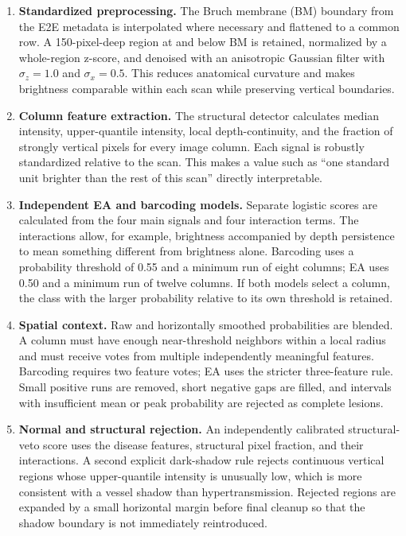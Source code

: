 \documentclass[11pt]{article}
\begin{document}
\begin{enumerate}
    \item \textbf{Standardized preprocessing.}  The Bruch membrane (BM)
    boundary from the E2E metadata is interpolated where necessary and
    flattened to a common row.  A 150-pixel-deep region at and below BM is
    retained, normalized by a whole-region z-score, and denoised with an
    anisotropic Gaussian filter with
    $\sigma_z=1.0$ and $\sigma_x=0.5$.  This reduces anatomical curvature and
    makes brightness comparable within each scan while preserving vertical
    boundaries.

    \item \textbf{Column feature extraction.}  The structural detector
    calculates median intensity, upper-quantile intensity, local
    depth-continuity, and the fraction of strongly vertical pixels for every
    image column.  Each signal is robustly standardized relative to the scan.
    This makes a value such as ``one standard unit brighter than the rest of
    this scan'' directly interpretable.

    \item \textbf{Independent EA and barcoding models.}  Separate logistic
    scores are calculated from the four main signals and four interaction
    terms.  The interactions allow, for example, brightness accompanied by
    depth persistence to mean something different from brightness alone.
    Barcoding uses a probability threshold of 0.55 and a minimum run of eight
    columns; EA uses 0.50 and a minimum run of twelve columns.  If both models
    select a column, the class with the larger probability relative to its own
    threshold is retained.

    \item \textbf{Spatial context.}  Raw and horizontally smoothed
    probabilities are blended.  A column must have enough near-threshold
    neighbors within a local radius and must receive votes from multiple
    independently meaningful features.  Barcoding requires two feature votes;
    EA uses the stricter three-feature rule.  Small positive runs are removed,
    short negative gaps are filled, and intervals with insufficient mean or
    peak probability are rejected as complete lesions.

    \item \textbf{Normal and structural rejection.}  An independently
    calibrated structural-veto score uses the disease features, structural
    pixel fraction, and their interactions.  A second explicit dark-shadow
    rule rejects continuous vertical regions whose upper-quantile intensity is
    unusually low, which is more consistent with a vessel shadow than
    hypertransmission.  Rejected regions are expanded by a small horizontal
    margin before final cleanup so that the shadow boundary is not immediately
    reintroduced.


\end{enumerate}
\end{document}
